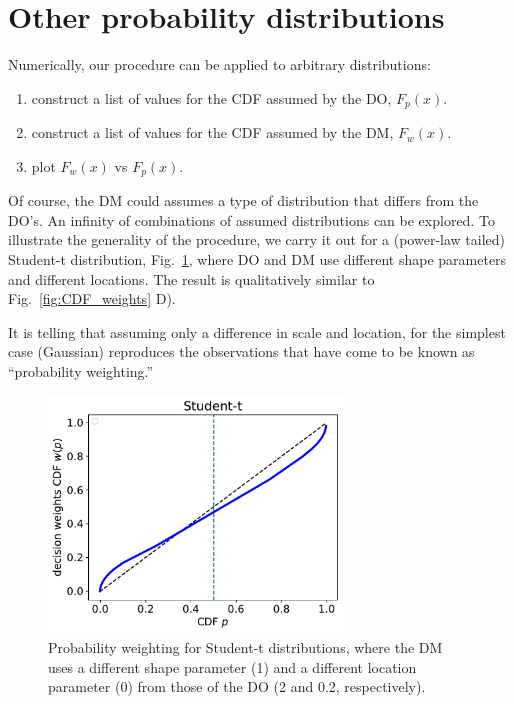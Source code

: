 \documentclass[11pt]{article}
\newcommand{\flabel}[1]{\label{fig:#1}}
\newcommand{\fref}[1]{Fig.~\ref{fig:#1}}
\numberwithin{equation}{section}
\begin{document}
\section{Other probability distributions}
Numerically, our procedure can be applied to arbitrary distributions: 
\begin{enumerate}
\item
construct a list of values for the CDF assumed by the DO, $F_p(x)$.
\item
construct a list of values for the CDF assumed by the DM, $F_w(x)$.
\item
plot $F_w(x)$ vs $F_p(x)$.
\end{enumerate}
Of course, the DM could assumes a type of distribution that differs from the DO's. An infinity of combinations of assumed distributions can be explored. To illustrate the generality of the procedure, we carry it out for a (power-law tailed) Student-t distribution, \fref{other_CDFs}, where DO and DM use different shape parameters and different locations. The result is qualitatively similar to \fref{CDF_weights} D). 

It is telling that assuming only a difference in scale and location, for the simplest case (Gaussian) reproduces the observations that have come to be known as ``probability weighting.''

\begin{figure}
\centering
\includegraphics[width=0.7\textwidth]{./figs/Student-t.pdf}
\caption{Probability weighting for Student-t distributions, where the DM uses a different shape parameter (1) and a different location parameter (0) from those of the DO (2 and 0.2, respectively).}
\flabel{other_CDFs}
\end{figure}

\clearpage
%
\end{document}
